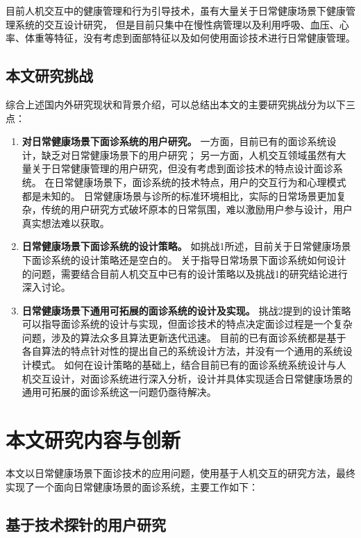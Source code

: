 目前人机交互中的健康管理和行为引导技术，虽有大量关于日常健康场景下健康管理系统的交互设计研究，
但是目前只集中在慢性病管理以及利用呼吸、血压、心率、体重等特征，没有考虑到面部特征以及如何使用面诊技术进行日常健康管理。

\subsection{本文研究挑战}
综合上述国内外研究现状和背景介绍，可以总结出本文的主要研究挑战分为以下三点：
\begin{enumerate}
    \item \textbf{对日常健康场景下面诊系统的用户研究。}
    一方面，目前已有的面诊系统设计，缺乏对日常健康场景下的用户研究；
    另一方面，人机交互领域虽然有大量关于日常健康管理的用户研究，但没有考虑到面诊技术的特点设计面诊系统。
    在日常健康场景下，面诊系统的技术特点，用户的交互行为和心理模式都是未知的。
    日常健康场景与诊所的标准环境相比，实际的日常场景更加复杂，传统的用户研究方式破坏原本的日常氛围，难以激励用户参与设计，用户真实想法难以获取。

    \item \textbf{日常健康场景下面诊系统的设计策略。}
    如挑战1所述，目前关于日常健康场景下面诊系统的设计策略还是空白的。
    关于指导日常场景下面诊系统如何设计的问题，需要结合目前人机交互中已有的设计策略以及挑战1的研究结论进行深入讨论。

    \item \textbf{日常健康场景下通用可拓展的面诊系统的设计及实现。}
    挑战2提到的设计策略可以指导面诊系统的设计与实现，但面诊技术的特点决定面诊过程是一个复杂问题，涉及的算法众多且算法更新迭代迅速。
    目前的已有面诊系统都是基于各自算法的特点针对性的提出自己的系统设计方法，并没有一个通用的系统设计模式。
    如何在设计策略的基础上，结合目前已有的面诊系统系统设计与人机交互设计，对面诊系统进行深入分析，设计并具体实现适合日常健康场景的通用可拓展的面诊系统这一问题仍亟待解决。
    
\end{enumerate}

\section{本文研究内容与创新}

本文以日常健康场景下面诊技术的应用问题，使用基于人机交互的研究方法，最终实现了一个面向日常健康场景的面诊系统，主要工作如下：

\subsection{基于技术探针的用户研究}

